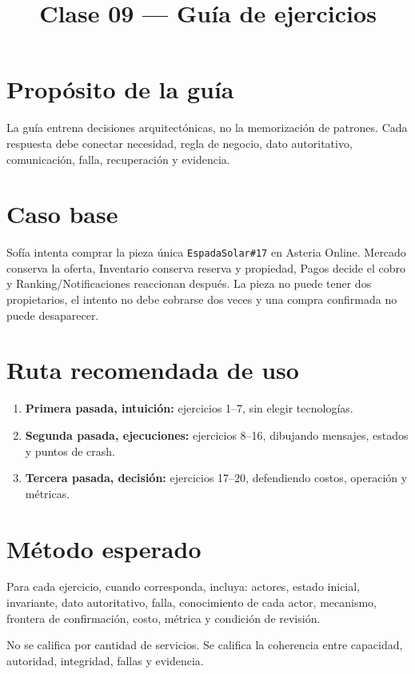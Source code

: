 \documentclass[variant=guia,cover=institutional,mode=screen]{ua-engineering-v6-article}
\title{Clase 09 --- Guía de ejercicios}
\author{\UAProfessor}
\date{\UADate}
\begin{document}
\maketitle

\section{Propósito de la guía}
La guía entrena decisiones arquitectónicas, no la memorización de patrones. Cada respuesta debe conectar necesidad, regla de negocio, dato autoritativo, comunicación, falla, recuperación y evidencia.

\section{Caso base}
Sofía intenta comprar la pieza única \texttt{EspadaSolar\#17} en Asteria Online. Mercado conserva la oferta, Inventario conserva reserva y propiedad, Pagos decide el cobro y Ranking/Notificaciones reaccionan después. La pieza no puede tener dos propietarios, el intento no debe cobrarse dos veces y una compra confirmada no puede desaparecer.

\section{Ruta recomendada de uso}
\begin{enumerate}
\item \textbf{Primera pasada, intuición:} ejercicios 1--7, sin elegir tecnologías.
\item \textbf{Segunda pasada, ejecuciones:} ejercicios 8--16, dibujando mensajes, estados y puntos de crash.
\item \textbf{Tercera pasada, decisión:} ejercicios 17--20, defendiendo costos, operación y métricas.
\end{enumerate}

\section{Método esperado}
Para cada ejercicio, cuando corresponda, incluya: actores, estado inicial, invariante, dato autoritativo, falla, conocimiento de cada actor, mecanismo, frontera de confirmación, costo, métrica y condición de revisión.

\begin{uawarn}
No se califica por cantidad de servicios. Se califica la coherencia entre capacidad, autoridad, integridad, fallas y evidencia.
\end{uawarn}
\end{document}
